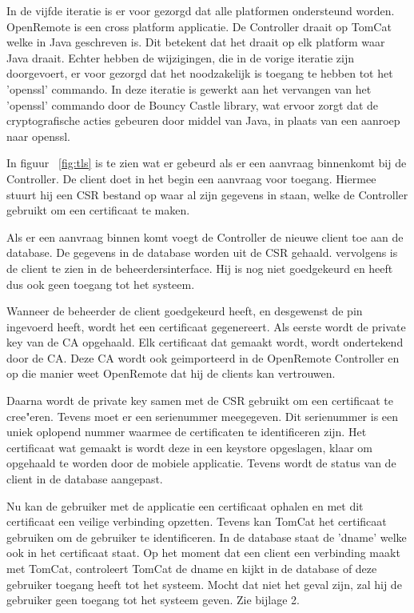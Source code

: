 \documentclass[]{article}
\begin{document}
In de vijfde iteratie is er voor gezorgd dat alle platformen ondersteund worden.
OpenRemote is een cross platform applicatie. De Controller draait op TomCat
welke in Java geschreven is. Dit betekent dat het draait op elk platform waar
Java draait. Echter hebben de wijzigingen, die in de vorige iteratie zijn
doorgevoert, er voor gezorgd dat het noodzakelijk is toegang te hebben tot
het 'openssl' commando. In deze iteratie is gewerkt aan het vervangen van het
'openssl' commando door de Bouncy Castle library, wat ervoor zorgt dat de
cryptografische acties gebeuren door middel van Java, in plaats van een aanroep
naar openssl. 

In figuur ~\ref{fig:tls} is te zien wat er gebeurd als er een
aanvraag binnenkomt bij de Controller. De client doet in het begin een aanvraag
voor toegang. Hiermee stuurt hij een CSR bestand op waar al zijn gegevens in staan,
welke de Controller gebruikt om een certificaat te maken. 

Als er een aanvraag binnen komt voegt de Controller de nieuwe client toe aan de
database. De gegevens in de database worden uit de CSR gehaald. vervolgens is de
client te zien in de beheerdersinterface. Hij is nog niet
goedgekeurd en heeft dus ook geen toegang tot het systeem.

Wanneer de beheerder de client goedgekeurd heeft, en desgewenst de pin ingevoerd
heeft, wordt het een certificaat gegenereert. Als eerste
wordt de private key van de CA opgehaald. Elk certificaat dat gemaakt wordt,
wordt ondertekend door de CA. Deze CA wordt ook geimporteerd in de OpenRemote
Controller en op die manier weet OpenRemote dat hij de clients kan vertrouwen.

Daarna wordt de private key samen met de CSR gebruikt om een certificaat te
cree"eren. Tevens moet er een serienummer meegegeven. Dit serienummer is een
uniek oplopend nummer waarmee de certificaten te identificeren zijn. Het
certificaat wat gemaakt is wordt deze in een keystore
opgeslagen, klaar om opgehaald te worden door de mobiele applicatie. Tevens wordt de
status van de client in de database aangepast.

Nu kan de gebruiker met de applicatie een certificaat ophalen en met dit
certificaat een veilige verbinding opzetten. Tevens kan TomCat het certificaat
gebruiken om de gebruiker te identificeren. In de database staat de 'dname'
welke ook in het certificaat staat. Op het moment dat een client een verbinding
maakt met TomCat, controleert TomCat de dname en kijkt in de database of deze
gebruiker toegang heeft tot het systeem. Mocht dat niet het geval zijn, zal hij
de gebruiker geen toegang tot het systeem geven.
Zie bijlage 2.
\end{document}
